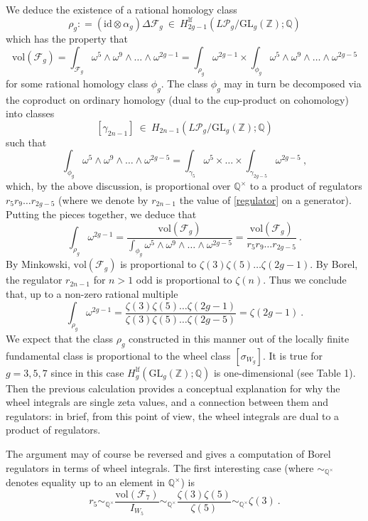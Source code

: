 \documentclass[10pt]{amsart}
\newcommand{\QQ}{{\mathbb Q}}
\newcommand{\ZZ}{{\mathbb Z}}
\theoremstyle{plain}
\newcommand{\GL}{\mathrm{GL}}
\newcommand{\lf}{\mathrm{lf}}
\newcommand{\0}{\color{blue}{\mathsf{0}}}
\begin{document}
We deduce the existence of a  rational homology   class 
\begin{equation} \label{rhoclass}   \rho_g: = \left( \mathrm{id} \otimes  \alpha_g\right)  \Delta \mathcal{F}_g  \ \in  \  H^{\lf}_{2g-1}( L\mathcal{P}_g/\GL_g(\ZZ);\QQ) \end{equation}
which has the property that 
\[ \mathrm{vol}(\mathcal{F}_g)  = \int_{\mathcal{F}_g} \omega^5 \wedge \omega^9 \wedge \ldots \wedge \omega^{2g-1} =  \int_{\rho_g} \omega^{2g-1}  \times  \int_{\phi_g}  \omega^5 \wedge \omega^9 \wedge \ldots \wedge \omega^{2g-5}  \]
for some rational  homology class $\phi_g$. The class $\phi_g$ may in turn be decomposed via the coproduct on ordinary homology (dual to the cup-product on cohomology) into classes  
\[ [\gamma_{2n-1} ]  \ \in \ H_{2n-1} (L\mathcal{P}_g / \GL_g(\ZZ);\QQ)    \]
such that 
\[ \int_{\phi_g}  \omega^5 \wedge \omega^9 \wedge \ldots \wedge \omega^{2g-5}  = \int_{\gamma_5} \omega^5 \times \ldots  \times \int_{\gamma_{2g-5}} \omega^{2g-5} \ ,  \]
which, by the above discussion, is proportional over $\QQ^{\times}$ to a  product of  regulators $r_5 r_9 \ldots r_{2g-5}$ (where we denote by $r_{2n-1}$ the value of \eqref{regulator} on a generator). Putting the pieces together, we deduce that 
\[   \int_{\rho_g} \omega^{2g-1}   = \frac{   \mathrm{vol}(\mathcal{F}_g)   } {\int_{\phi_g}    \omega^5 \wedge \omega^9 \wedge \ldots \wedge \omega^{2g-5}      } = \frac{   \mathrm{vol}(\mathcal{F}_g)   } { r_5 r_9 \ldots r_{2g-5}}  \ .   \]
By Minkowski, $ \mathrm{vol}(\mathcal{F}_g) $ is proportional to  $\zeta(3)\zeta(5) \ldots \zeta(2g-1) $. By Borel, the regulator $r_{2n-1}$ for $n>1$ odd is proportional to $\zeta(n)$. Thus we conclude that, up to a non-zero rational multiple
\[  \int_{\rho_g} \omega^{2g-1}   =  \frac{ \zeta(3) \zeta(5) \ldots \zeta(2g-1)}{\zeta(3) \zeta(5)\ldots \zeta(2g-5)} = \zeta(2g-1) \ .  \]
We expect that the class $\rho_g$ constructed in this manner out of the locally finite fundamental class is proportional to the wheel class $[\sigma_{W_g}]$.  It is true for  $g=3,5,7$ since in this case $H^{\lf}_{g}(\GL_g(\ZZ);\QQ)$ is one-dimensional  (see Table 1). Then the previous calculation provides a conceptual explanation for why the wheel integrals are single zeta values, and a  connection between them and regulators: in brief,  from this point of view, the wheel integrals are dual to a product of regulators.  

The argument may of course be reversed and gives a computation of Borel regulators in terms of wheel integrals. The first interesting case (where  $\sim_{\QQ^{\times}}$ denotes equality up to an element in $\QQ^{\times}$) is 
\[ r_5 \sim_{\QQ^{\times}}  \frac{\mathrm{vol}(\mathcal{F}_7)}{ I_{W_5}} \sim_{\QQ^{\times}}   \frac{\zeta(3) \zeta(5)}{\zeta(5)} \sim_{\QQ^{\times}}   \zeta(3) \ .\]
\end{document}
